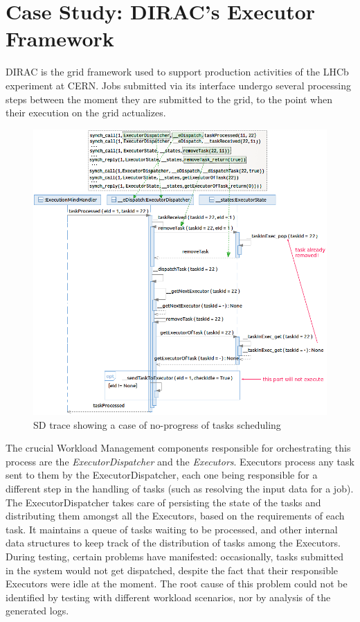 \documentclass[letter]{llncs}
\newcommand{\figshrink}{\vspace{-.6cm}}
\newcommand{\figshrinkend}{}
\newcommand{\subsecshrinkbegin}{\vspace{-.2cm}}
\begin{document}
\section{Case Study: DIRAC’s Executor Framework}
\label{sec:Application}
\subsecshrinkbegin
\vspace{-2 pt}
DIRAC \cite{DIRAC_CommGridSolution} is the grid framework used to support production activities of the LHCb experiment at CERN.
Jobs submitted via its interface undergo several processing steps between the moment they are submitted to the grid, 
to the point when their execution on the grid actualizes. 
\begin{figure}[!t]
\centering
\figshrink
\includegraphics[width=1.0\linewidth,keepaspectratio=true]{./Trace_final.png}
\caption{SD trace showing a case of no-progress of tasks scheduling}
\label{fig:noProgress}
\figshrinkend
\end{figure}
The crucial Workload Management components responsible for orchestrating this process are the \emph{ExecutorDispatcher} and 
the \emph{Executors}. Executors process any task sent to them by the ExecutorDispatcher, each one being responsible for a different step in the handling of tasks
(such as resolving the input data for a job).
The ExecutorDispatcher takes care of persisting the state of the tasks and distributing them amongst all the Executors, based on the
requirements of each task. It maintains a queue of tasks waiting to be processed, and other internal data structures to keep track
of the distribution of tasks among the Executors.
During testing, certain problems have manifested: occasionally, tasks submitted in the system would not get dispatched, despite the fact that their responsible Executors
were idle at the moment.
The root cause of this problem could not be identified by testing  with different workload scenarios, nor by analysis of the 
generated logs. 
\end{document}
